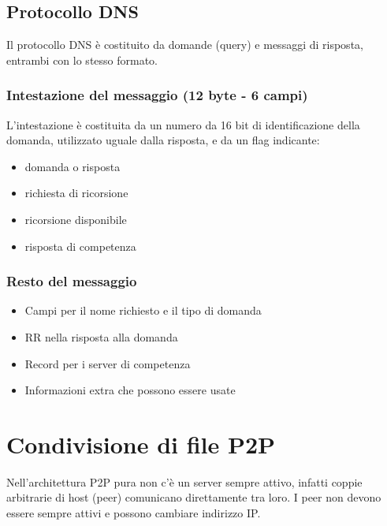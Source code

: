 \documentclass{report}
\begin{document}
	\subsection{Protocollo DNS}
	Il protocollo DNS è costituito da domande (query) e messaggi di risposta, entrambi con lo stesso formato.
	\subsubsection{Intestazione del messaggio (12 byte - 6 campi)}
	L'intestazione è costituita da un numero da 16 bit di identificazione della domanda, utilizzato uguale dalla risposta, e da un flag indicante:
	\begin{itemize}
		\item domanda o risposta
		\item richiesta di ricorsione
		\item ricorsione disponibile
		\item risposta di competenza
	\end{itemize}
	\subsubsection{Resto del messaggio}
	\begin{itemize}
		\item Campi per il nome richiesto e il tipo di domanda
		\item RR nella risposta alla domanda
		\item Record per i server di competenza
		\item Informazioni extra che possono essere usate
	\end{itemize}
	\newpage
	\section{Condivisione di file P2P}
	Nell'architettura P2P pura non c'è un server sempre attivo, infatti coppie arbitrarie di host (peer) comunicano direttamente tra loro. I peer non devono essere sempre attivi e possono cambiare indirizzo IP.
\end{document}
